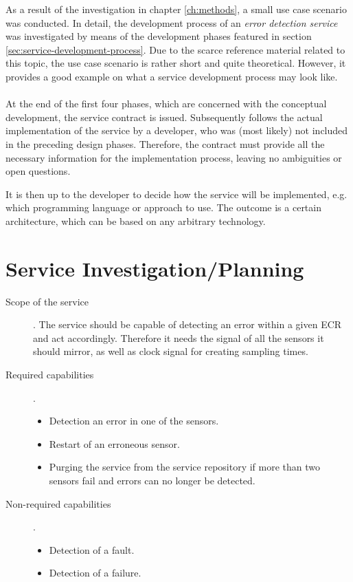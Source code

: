 As a result of the investigation in chapter \ref{ch:methods}, a small use case scenario was conducted. In detail, the development process of an \emph{error detection service} was investigated by means of the development phases featured in section \ref{sec:service-development-process}. Due to the scarce reference material related to this topic, the use case scenario is rather short and quite theoretical. However, it provides a good example on what a service development process may look like.
\\
\\
At the end of the first four phases, which are concerned with the conceptual development, the service contract is issued. Subsequently follows the actual implementation of the service by a developer, who was (most likely) not included in the preceding design phases. Therefore, the contract must provide all the necessary information for the implementation process, leaving no ambiguities or open questions.

It is then up to the developer to decide how the service will be implemented, e.g. which programming language or approach to use. The outcome is a certain architecture, which can be based on any arbitrary technology. 



\section{Service Investigation/Planning}


\begin{description}
\item [Scope of the service].
The service should be capable of detecting an error within a given ECR and act accordingly. Therefore it needs the signal of all the sensors it should mirror, as well as clock signal for creating sampling times.
\item [Required capabilities].
	\begin{itemize}
	\item Detection an error in one of the sensors.
	\item Restart of an erroneous sensor.
	\item Purging the service from the service repository if more than two sensors fail and errors can no longer be detected.
	\end{itemize}
\item [Non-required capabilities].
	\begin{itemize}
	\item Detection of a fault.
	\item Detection of a failure.
	\end{itemize}
\end{description}



